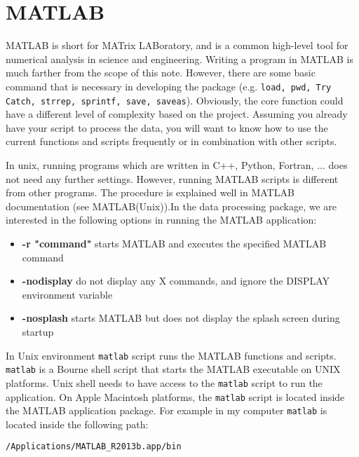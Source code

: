 \section{MATLAB\textsuperscript{\textregistered}}

MATLAB\textsuperscript{\textregistered} is short for MATrix LABoratory, and is a common high-level tool for numerical analysis in science and engineering. Writing a program in MATLAB is much farther from the scope of this note. However, there are some basic command that is necessary in developing the package (e.g. \texttt{load, pwd, Try Catch, strrep, sprintf, save, saveas}). Obviously, the core function could have a different level of complexity based on the project. Assuming you already have your script to process the data, you will want to know how to use the current functions and scripts frequently or in combination with other scripts.  

\noindent
In unix, running programs which are written in C++, Python, Fortran, ... does not need any further settings. However, running MATLAB scripts is different from other programs. The procedure is explained well in MATLAB documentation (see MATLAB(Unix)).In the data processing package,  we are interested in the following options in running the MATLAB application:

\begin{itemize}
  \item   \textbf{-r "command"} starts MATLAB and executes the specified MATLAB command
    \item \textbf{-nodisplay} do not display any X commands, and ignore the DISPLAY environment variable
  \item   \textbf{-nosplash} starts MATLAB but does not display the splash screen during startup
\end{itemize}

\noindent
In Unix environment \texttt{matlab} script runs the MATLAB functions and scripts. \texttt{matlab} is a Bourne shell script that starts the MATLAB executable on UNIX\textsuperscript{\textregistered} platforms. Unix shell needs to have access to the \texttt{matlab} script to run the application. On Apple Macintosh platforms, the \texttt{matlab} script is located inside the MATLAB application package. For example in my computer \texttt{matlab}  is located inside the following path:\\
 
\begin{mdframed}[hidealllines=true,backgroundcolor=gray!20]

\fontsize{10pt}{1pt}
\texttt{/Applications/MATLAB\_R2013b.app/bin}
\end{mdframed}

